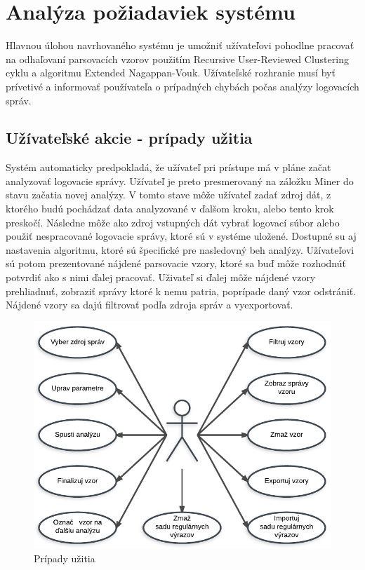 \chapter{Analýza požiadaviek systému}

Hlavnou úlohou navrhovaného systému je umožniť užívateľovi pohodlne pracovať na odhaľovaní parsovacích vzorov použitím Recursive User-Reviewed Clustering cyklu a algoritmu Extended Nagappan-Vouk. Užívateľské rozhranie musí byť prívetivé a informovať používateľa o prípadných chybách počas analýzy logovacích správ.

\section{Užívateľské akcie - prípady užitia}

Systém automaticky predpokladá, že užívateľ pri prístupe má v pláne začat analyzovať logovacie správy. Užívateľ je preto presmerovaný na záložku Miner do stavu začatia novej analýzy. V tomto stave môže užívateľ zadať zdroj dát, z ktorého budú pochádzať data analyzované v ďalšom kroku, alebo tento krok preskočí. Následne môže ako zdroj vstupných dát vybrať logovací súbor alebo použiť nespracované logovacie správy, ktoré sú v systéme uložené. Dostupné su aj nastavenia algoritmu, ktoré sú špecifické pre nasledovný beh analýzy. Užívateľovi sú potom prezentované nájdené parsovacie vzory, ktoré sa buď môže rozhodnúť potvrdiť ako s nimi ďalej pracovať. Uživateľ si ďalej môže nájdené vzory prehliadnuť, zobraziť správy ktoré k nemu patria, poprípade daný vzor odstrániť. Nájdené vzory sa dajú filtrovať podľa zdroja správ a vyexportovať.

\begin{figure}[htbp]
 \centering 
 \begin{minipage}{0.9\linewidth}
 	\centering
 	\includegraphics[width=\textwidth]{Images/thesis-use-cases.pdf}	
 \end{minipage}
  \caption{Prípady užitia}
  \label{fig:use-cases}
\end{figure}

